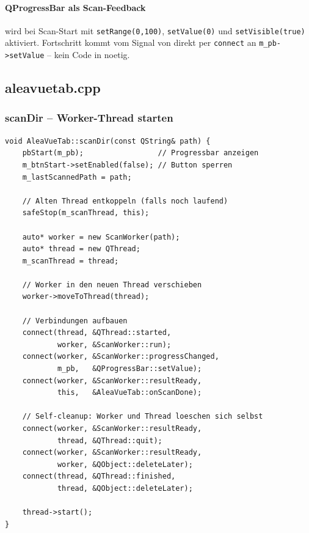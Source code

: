 \paragraph{QProgressBar als Scan-Feedback}
 wird bei Scan-Start mit
\verb|setRange(0,100)|, \verb|setValue(0)| und
\verb|setVisible(true)| aktiviert. Fortschritt
kommt vom Signal  von
 direkt per \verb|connect| an
\verb|m_pb->setValue| -- kein Code in 
noetig.

\subsection{aleavuetab.cpp}

\subsubsection{scanDir -- Worker-Thread starten}

\begin{lstlisting}[caption={scanDir: das Worker-Thread-Grundmuster in TilVista}]
void AleaVueTab::scanDir(const QString& path) {
    pbStart(m_pb);                 // Progressbar anzeigen
    m_btnStart->setEnabled(false); // Button sperren
    m_lastScannedPath = path;

    // Alten Thread entkoppeln (falls noch laufend)
    safeStop(m_scanThread, this);

    auto* worker = new ScanWorker(path);
    auto* thread = new QThread;
    m_scanThread = thread;

    // Worker in den neuen Thread verschieben
    worker->moveToThread(thread);

    // Verbindungen aufbauen
    connect(thread, &QThread::started,
            worker, &ScanWorker::run);
    connect(worker, &ScanWorker::progressChanged,
            m_pb,   &QProgressBar::setValue);
    connect(worker, &ScanWorker::resultReady,
            this,   &AleaVueTab::onScanDone);

    // Self-cleanup: Worker und Thread loeschen sich selbst
    connect(worker, &ScanWorker::resultReady,
            thread, &QThread::quit);
    connect(worker, &ScanWorker::resultReady,
            worker, &QObject::deleteLater);
    connect(thread, &QThread::finished,
            thread, &QObject::deleteLater);

    thread->start();
}
\end{lstlisting}

